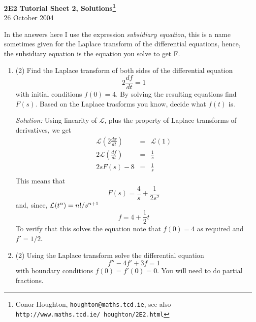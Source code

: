 \documentclass[12pt]{article}
\begin{document}
\begin{center}
\textsf{
{\bf 2E2 Tutorial Sheet 2, Solutions\footnote{Conor Houghton, {\tt houghton@maths.tcd.ie}, see also {\tt http://www.maths.tcd.ie/ houghton/2E2.html}}}\\[1cm] 26 October 2004}
\end{center}


\renewcommand{\labelenumi}{\arabic{enumi}.}

\noindent In the answers here I use the expression {\sl subsidiary equation}, this is a name sometimes given for the Laplace transform of the differential equations, hence, the subsidiary equation is the equation you solve to get F.

\begin{enumerate}
\item (2)
Find the Laplace transform of both sides of the differential equation
\[
 2 \frac{df}{dt} = 1
\]
with initial conditions $f(0) =4$. By solving the resulting equations
find $F(s)$. Based on the Laplace trasforms you know, decide what $f(t)$ is.

\noindent\textit{Solution:} Using linearity of $\mathcal{L}$, plus the
property of Laplace transforms of derivatives, we get
\begin{eqnarray}
\mathcal{L}\left(2 \frac{dx}{dt} \right)
&=& \mathcal{L}(1)\nonumber\\
2\mathcal{L}\left(\frac{df}{dt}\right) &=&\frac{1}{s}\nonumber\\
 2 s F(s)-8
&=& \frac{1}{s}\\
\end{eqnarray}
This means that
\begin{equation}
F(s)=\frac{4}{s}+\frac{1}{2s^2}
\end{equation}
and, since, ${\cal L}(t^n)=n!/s^{n+1}$
\begin{equation}
f=4+\frac{1}{2}t
\end{equation}
To verify that this solves the equation note that $f(0)=4$ as required and $f'=1/2$.




\item (2)
Using the Laplace transform solve the differential equation
\begin{equation}
f''-4f'+3f=1
\end{equation}
with boundary conditions $f(0)=f'(0)=0$. You will need to do partial fractions.


\end{enumerate}
\end{document}
